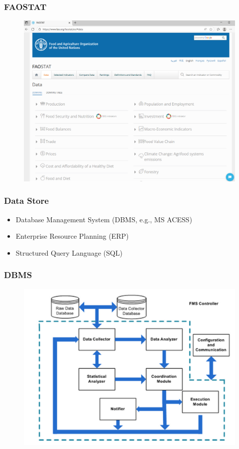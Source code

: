 \documentclass[
	11pt, %
]{beamer}
\begin{document}
\begin{frame}
	\frametitle{FAOSTAT}
	\begin{figure}
		\includegraphics[width=0.8\linewidth]{images/figure8.png}
		\label{fig}
	\end{figure}
\end{frame}

\begin{frame}
	\frametitle{Data Store}
		\begin{itemize}
			\item Database Management System (DBMS, e.g., MS ACESS)
			\item Enterprise Resource Planning (ERP)
			\item Structured Query Language (SQL)
		\end{itemize}
\end{frame}

\begin{frame}
	\frametitle{DBMS}
	\begin{figure}
		\includegraphics[width=0.8\linewidth]{images/figure9.png}
		\label{fig:Kaloxylos et al. 2012}
	\end{figure}
\end{frame}
\end{document}
